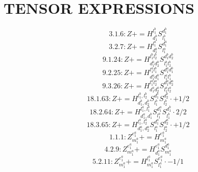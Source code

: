 \documentclass[letterpaper,10pt,fleqn,leqno,onecolumn]{article}
\begin{document}
\section{TENSOR EXPRESSIONS}
\begin{equation} \;\;\;\;\;\;  3.1.6: Z+=H^{l_{1}^{b}}_{d_{1}^{b}}S^{d_{1}^{b}}_{l_{1}^{b}} \end{equation}
\begin{equation} \;\;\;\;\;\;  3.2.7: Z+=H^{l_{1}^{a}}_{d_{1}^{a}}S^{d_{1}^{a}}_{l_{1}^{a}} \end{equation}
\begin{equation} \;\;\;\;\;\;  9.1.24: Z+=H^{l_{1}^{b}l_{2}^{b}}_{d_{1}^{b}d_{2}^{b}}S^{d_{1}^{b}d_{2}^{b}}_{l_{1}^{b}l_{2}^{b}} \end{equation}
\begin{equation} \;\;\;\;\;\;  9.2.25: Z+=H^{l_{1}^{a}l_{1}^{b}}_{d_{1}^{a}d_{1}^{b}}S^{d_{1}^{a}d_{1}^{b}}_{l_{1}^{a}l_{1}^{b}} \end{equation}
\begin{equation} \;\;\;\;\;\;  9.3.26: Z+=H^{l_{1}^{a}l_{2}^{a}}_{d_{1}^{a}d_{2}^{a}}S^{d_{1}^{a}d_{2}^{a}}_{l_{1}^{a}l_{2}^{a}} \end{equation}
\begin{equation} \;\;\;\;\;\;  18.1.63: Z+=H^{l_{1}^{b},l_{2}^{b}}_{d_{1}^{b},d_{2}^{b}}S^{d_{1}^{b}}_{l_{1}^{b}}S^{d_{2}^{b}}_{l_{2}^{b}}\cdot +1/2 \end{equation}
\begin{equation} \;\;\;\;\;\;  18.2.64: Z+=H^{l_{1}^{a},l_{1}^{b}}_{d_{1}^{a},d_{1}^{b}}S^{d_{1}^{a}}_{l_{1}^{a}}S^{d_{1}^{b}}_{l_{1}^{b}}\cdot 2/2 \end{equation}
\begin{equation} \;\;\;\;\;\;  18.3.65: Z+=H^{l_{1}^{a},l_{2}^{a}}_{d_{1}^{a},d_{2}^{a}}S^{d_{1}^{a}}_{l_{1}^{a}}S^{d_{2}^{a}}_{l_{2}^{a}}\cdot +1/2 \end{equation}
\begin{equation} \;\;\;\;\;\;  1.1.1: Z^{e_{1}^{a}}_{m_{1}^{a}}+=H^{e_{1}^{a}}_{m_{1}^{a}} \end{equation}
\begin{equation} \;\;\;\;\;\;  4.2.9: Z^{e_{1}^{a}}_{m_{1}^{a}}+=H^{e_{1}^{a}}_{d_{1}^{a}}S^{d_{1}^{a}}_{m_{1}^{a}} \end{equation}
\begin{equation} \;\;\;\;\;\;  5.2.11: Z^{e_{1}^{a}}_{m_{1}^{a}}+=H^{l_{1}^{a}}_{m_{1}^{a}}S^{e_{1}^{a}}_{l_{1}^{a}}\cdot -1/1 \end{equation}
\end{document}
